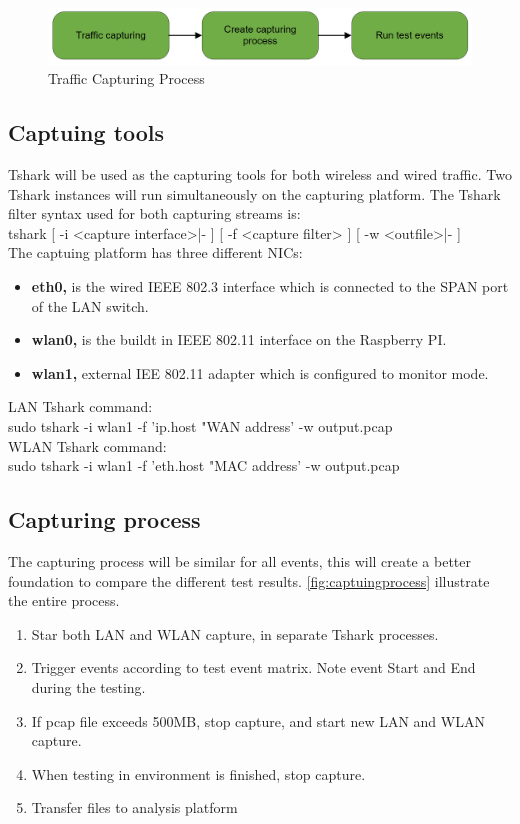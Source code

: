 \begin{figure}[H]
    \centering
    \includegraphics[width=\textwidth]{figures/TrafficCapturingProcess.png}
    \caption{Traffic Capturing Process}
    \label{fig:TrafficCapturingProcess}
\end{figure}

\subsection{Captuing tools}
Tshark will be used as the capturing tools for both wireless and wired traffic. Two Tshark instances will run simultaneously on the capturing platform. The Tshark filter syntax used for both capturing streams is: 
\\
tshark [ -i <capture interface>|- ] [ -f <capture filter> ] [ -w <outfile>|- ]
\\
The captuing platform has three different NICs:
\begin{itemize}
    \item \textbf{eth0,} is the wired IEEE 802.3 interface which is connected to the SPAN port of the LAN switch.
    \item \textbf{wlan0,} is the buildt in IEEE 802.11 interface on the Raspberry PI.
    \item  \textbf{wlan1,} external IEE 802.11 adapter which is configured to monitor mode.
\end{itemize}

LAN Tshark command:
\\
sudo tshark -i wlan1 -f 'ip.host "WAN address' -w output.pcap
\\
WLAN Tshark command:
\\
sudo tshark -i wlan1 -f 'eth.host "MAC address' -w output.pcap
\\

\subsection{Capturing process}
The capturing process will be similar for all events, this will create a better foundation to compare the different test results. \ref{fig:captuingprocess} illustrate the entire process.
\begin{enumerate}
    \item Star both LAN and WLAN capture, in separate Tshark processes.
    \item Trigger events according to test event matrix. Note event Start and End during the testing. 
    \item If pcap file exceeds 500MB, stop capture, and start new LAN and WLAN capture.
    \item When testing in environment is finished, stop capture. 
    \item Transfer files to analysis platform
\end{enumerate}
   

